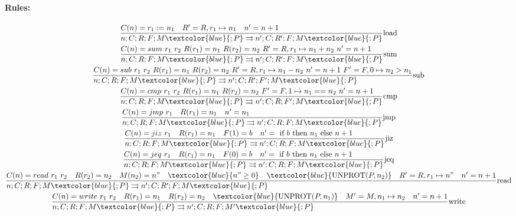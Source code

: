 \documentclass{article}
\newcommand{\execs}[0]{\ensuremath{\rightrightarrows}}
\begin{document}
\paragraph{Rules:}
\begin{gather*}
    \st[load]{n;C;R;F;M\textcolor{blue}{;P} \execs n';C;R';F;M\textcolor{blue}{;P}}{C(n)=r_1:=n_1 \quad R'=R,r_1\mapsto n_1 \quad n'=n+1} \\
    \st[sum]{n;C;R;F;M\textcolor{blue}{;P} \execs n';C;R';F;M\textcolor{blue}{;P}}{
        C(n)=sum\ r_1\ r_2 \ 
        R(r_1)=n_1 \ 
        R(r_2)=n_2 \ 
        R'=R,r_1\mapsto n_1+n_2 \ 
        n'=n+1
    } \\
    \st[sub]{n;C;R;F;M\textcolor{blue}{;P} \execs n';C;R';F';M\textcolor{blue}{;P}}{
        C(n)=sub\ r_1\ r_2 \ 
        R(r_1)=n_1 \ 
        R(r_2)=n_2 \ 
        R'=R,r_1\mapsto n_1-n_2 \ 
        n'=n+1 \
        F'=F,0\mapsto n_2>n_1
    } \\
    \st[cmp]{n;C;R;F;M\textcolor{blue}{;P} \execs n';C;R;F';M\textcolor{blue}{;P}}{
        C(n)=cmp\ r_1\ r_2 \ 
        R(r_1)=n_1 \ 
        R(r_2)=n_2 \ 
        F'=F,1\mapsto n_1==n_2 \
        n'=n+1
    } \\
    \st[jmp]{n;C;R;F;M\textcolor{blue}{;P} \execs n';C;R;F;M\textcolor{blue}{;P}}{
        C(n)=jmp\ r_1 \quad
        R(r_1)=n_1 \quad
        n'=n_1
    } \\
    \st[jiz]{n;C;R;F;M\textcolor{blue}{;P} \execs n';C;R;F;M\textcolor{blue}{;P}}{
        C(n)=jiz\ r_1 \quad
        R(r_1)=n_1 \quad
        F(1)=b \quad
        n'=\IF b \THEN n_1 \ELSE n+1
    } \\
    \st[jeq]{n;C;R;F;M\textcolor{blue}{;P} \execs n';C;R;F;M\textcolor{blue}{;P}}{
        C(n)=jeq\ r_1 \quad
        R(r_1)=n_1 \quad
        F(0)=b \quad
        n'=\IF b \THEN n_1 \ELSE n+1
    } \\
    \st[read]{n;C;R;F;M\textcolor{blue}{;P} \execs n';C;R';F;M\textcolor{blue}{;P}}{
        C(n)=read\ r_1\ r_2 \quad
        R(r_2)=n_2 \quad
        M(n_2) = n" \quad
        \textcolor{blue}{n" \geq 0} \quad
        \textcolor{blue}{\te{UNPROT}(P, n_2)} \quad
        R' = R,r_1\mapsto n" \quad
        n'=n+1
    } \\
    \st[write]{n;C;R;F;M\textcolor{blue}{;P} \execs n';C;R;F;M'\textcolor{blue}{;P}}{
        C(n)=write\ r_1\ r_2 \quad
        R(r_1)=n_1 \quad
        R(r_2)=n_2 \quad
        \textcolor{blue}{\te{UNPROT}(P, n_1)} \quad
        M' = M,n_1\mapsto n_2 \quad
        n'=n+1
    } \\

\end{gather*}
\end{document}
